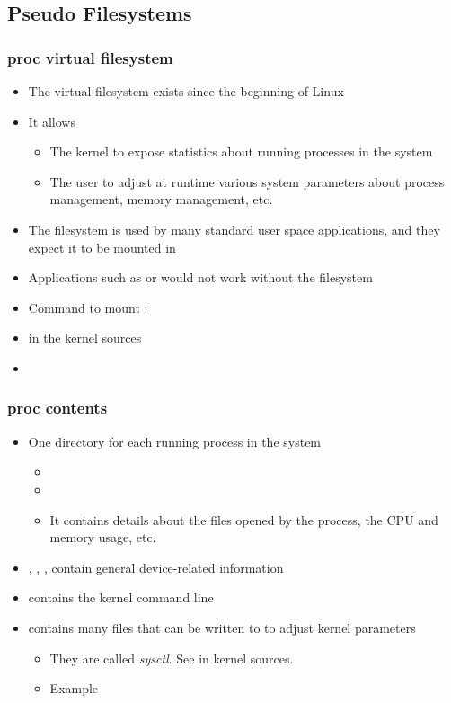 \subsection{Pseudo Filesystems}
\begin{frame}
  \frametitle{proc virtual filesystem}
  \begin{itemize}
  \item The  virtual filesystem exists since the beginning of
    Linux
  \item It allows
    \begin{itemize}
    \item The kernel to expose statistics about running processes in
      the system
    \item The user to adjust at runtime various system parameters
      about process management, memory management, etc.
    \end{itemize}
  \item The  filesystem is used by many standard user space
    applications, and they expect it to be mounted in 
  \item Applications such as  or  would not work
    without the  filesystem
  \item Command to mount :\\
  \item {} in the kernel sources
  \item {}
  \end{itemize}
\end{frame}

\begin{frame}
  \frametitle{proc contents}
  \begin{itemize}
  \item One directory for each running process in the system
    \begin{itemize}
    \item {}
    \item {}
    \item It contains details about the files opened by the process,
      the CPU and memory usage, etc.
    \end{itemize}
  \item {}, ,
    ,  contain general
    device-related information
  \item {} contains the kernel command line
  \item {} contains many files that can be written to to
    adjust kernel parameters
    \begin{itemize}
    \item They are called {\em sysctl}. See 
      in kernel sources.
    \item Example\\
    \end{itemize}
  \end{itemize}
\end{frame}

